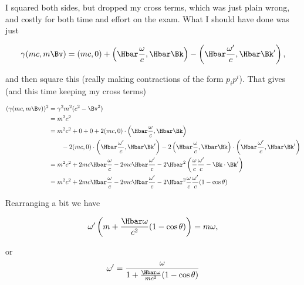 {I squared both sides, but dropped my cross terms, which was just plain wrong, and costly for both time and effort on the exam.  What I should have done was just

\begin{equation}\label{eqn:relativisticElectrodynamicsExamReflection:410}
\gamma (m c, m \Bv) =
(m c, 0) + \left(\Hbar \frac{\omega}{c}, \Hbar \Bk \right)
-\left(\Hbar \frac{\omega'}{c}, \Hbar \Bk' \right),
\end{equation}

and then square this (really making contractions of the form $p_i p^i$).  That gives (and this time keeping my cross terms)

\begin{equation}\label{eqn:relativisticElectrodynamicsExamReflection:1350}
\begin{aligned}
(\gamma (m c, m \Bv) )^2 
&= \gamma^2 m^2 (c^2 - \Bv^2) \\
&= m^2 c^2 \\
&=
m^2 c^2 + 0 + 0
+ 2 (m c, 0) 
\cdot \left(\Hbar \frac{\omega}{c}, \Hbar \Bk \right) \\
&\qquad - 2 (m c, 0) \cdot \left(\Hbar \frac{\omega'}{c}, \Hbar \Bk' \right)
- 2 
\left(\Hbar \frac{\omega}{c}, \Hbar \Bk \right)
\cdot \left(\Hbar \frac{\omega'}{c}, \Hbar \Bk' \right) \\
&=
m^2 c^2 + 2 m c \Hbar \frac{\omega}{c} - 2 m c \Hbar \frac{\omega'}{c}
- 2\Hbar^2 \left(
\frac{\omega}{c} \frac{\omega'}{c}
- 
\Bk \cdot \Bk'
\right) \\
&=
m^2 c^2 + 2 m c \Hbar \frac{\omega}{c} - 2 m c \Hbar \frac{\omega'}{c}
- 2\Hbar^2 
\frac{\omega}{c} \frac{\omega'}{c} (1 - \cos\theta)
\end{aligned}
\end{equation}

Rearranging a bit we have

\begin{equation}\label{eqn:relativisticElectrodynamicsExamReflection:430}
\omega' \left( m + \frac{\Hbar \omega}{c^2} ( 1 - \cos\theta ) \right) = m \omega,
\end{equation}

or
\begin{equation}\label{eqn:relativisticElectrodynamicsExamReflection:450}
\omega' = \frac{\omega}{
1 + \frac{\Hbar \omega}{m c^2} ( 1 - \cos\theta ) 
}
\end{equation}
} %

